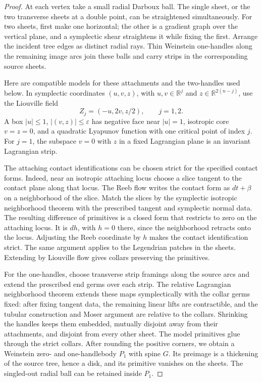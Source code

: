 \documentclass[11pt]{article}
\numberwithin{equation}{section}
\theoremstyle{definition}
\theoremstyle{remark}
\begin{document}
\begin{proof}
At each vertex take a small radial Darboux ball.  The single sheet,
or the two transverse sheets at a double point, can be straightened
simultaneously.  For two sheets, first make one horizontal; the other
is a gradient graph over the vertical plane, and a symplectic shear
straightens it while fixing the first.  Arrange the incident tree
edges as distinct radial rays.  Thin Weinstein one-handles along the
remaining image arcs join these balls and carry strips in the
corresponding source sheets.

Here are compatible models for these attachments and the two-handles
used below.  In symplectic coordinates $(u,v,z)$, with
$u,v\in\mathbb R^j$ and $z\in\mathbb R^{2(n-j)}$, use the Liouville field
\begin{equation}\label{topo:handle-field}
 Z_j=(-u,2v,z/2),\qquad j=1,2.
\end{equation}
A box $|u|\leq1$, $|(v,z)|\leq\varepsilon$ has negative face near
$|u|=1$, isotropic core $v=z=0$, and a quadratic Lyapunov function
with one critical point of index $j$.  For $j=1$, the subspace
$v=0$ with $z$ in a fixed Lagrangian plane is an invariant
Lagrangian strip.

The attaching contact identifications can be chosen strict for the
specified contact forms.  Indeed, near an isotropic attaching locus
choose a slice tangent to the contact plane along that locus.
The Reeb flow writes the contact form as $dt+\beta$ on a
neighborhood of the slice.  Match the slices by the symplectic
isotropic neighborhood theorem with the prescribed tangent and
symplectic normal data.  The resulting difference of primitives is
a closed form that restricts to zero on the attaching locus.
It is $dh$, with $h=0$ there, since the neighborhood retracts onto
the locus.  Adjusting the Reeb coordinate by $h$ makes the contact
identification strict.  The same argument applies to the Legendrian
patches in the sheets.  Extending by Liouville flow gives collars
preserving the primitives.

For the one-handles, choose transverse strip framings along the
source arcs and extend the prescribed end germs over each strip.
The relative Lagrangian neighborhood theorem extends these maps
symplectically with the collar germs fixed: after fixing tangent
data, the remaining linear lifts are contractible, and the tubular
construction and Moser argument are relative to the collars.
Shrinking the handles keeps them embedded, mutually disjoint away
from their attachments, and disjoint from every other sheet.
The model primitives glue through the strict collars.  After
rounding the positive corners, we obtain a Weinstein zero- and
one-handlebody $P_1$ with spine $G$.  Its preimage is a thickening
of the source tree, hence a disk, and its primitive vanishes on the
sheets.  The singled-out radial ball can be retained inside $P_1$.


\end{proof}
\end{document}
